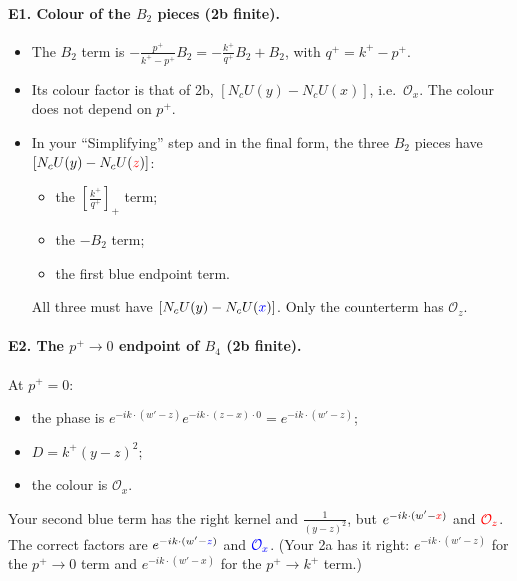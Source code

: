 \documentclass[10pt]{article}
\numberwithin{equation}{section}
\newcommand{\new}[1]{{\color{blue}#1}}
\newcommand{\old}[1]{{\color{red}#1}}
\newcommand{\Ox}{\mathcal O_x}
\newcommand{\Oz}{\mathcal O_z}
\begin{document}
\paragraph{E1. Colour of the $B_2$ pieces (2b finite).}
\begin{itemize}
\item The $B_2$ term is $-\frac{p^+}{k^+-p^+}B_2=-\frac{k^+}{q^+}B_2+B_2$, with $q^+=k^+-p^+$.
\item Its colour factor is that of 2b, $[N_cU(y)-N_cU(x)]$, i.e.\ $\Ox$. The colour does not depend on $p^+$.
\item In your ``Simplifying'' step and in the final form, the three $B_2$ pieces have $[N_cU(y)-N_cU(\old{z})]$:
\begin{itemize}
\item the $[\frac{k^+}{q^+}]_+$ term;
\item the $-B_2$ term;
\item the first blue endpoint term.
\end{itemize}
All three must have $[N_cU(y)-N_cU(\new{x})]$. Only the counterterm has $\Oz$.
\end{itemize}

\paragraph{E2. The $p^+\to0$ endpoint of $B_4$ (2b finite).} At $p^+=0$:
\begin{itemize}
\item the phase is $e^{-ik\cdot(w'-z)}e^{-ik\cdot(z-x)\cdot0}=e^{-ik\cdot(w'-z)}$;
\item $D=k^+(y-z)^2$;
\item the colour is $\Ox$.
\end{itemize}
Your second blue term has the right kernel and $\frac{1}{(y-z)^2}$, but $e^{-ik\cdot(w'-\old{x})}$ and $\old{\Oz}$. The correct factors are $e^{-ik\cdot(w'-\new{z})}$ and $\new{\Ox}$. (Your 2a has it right: $e^{-ik\cdot(w'-z)}$ for the $p^+\to0$ term and $e^{-ik\cdot(w'-x)}$ for the $p^+\to k^+$ term.)
\end{document}
